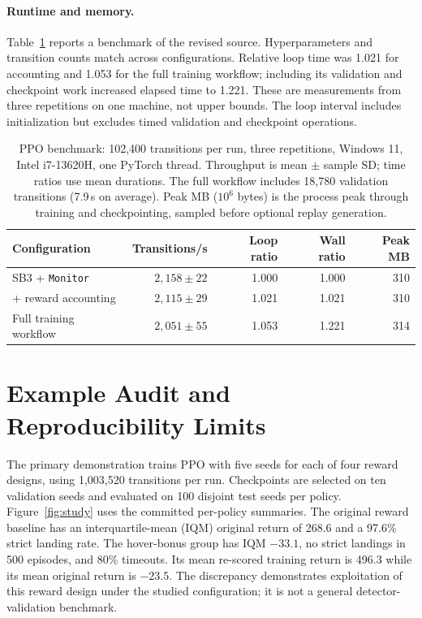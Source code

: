 \documentclass[twoside,11pt]{article}
\begin{document}
\paragraph{Runtime and memory.} Table~\ref{tab:overhead} reports a benchmark of the revised source.
Hyperparameters and transition counts match across configurations. Relative loop time was
1.021 for accounting and 1.053 for the full training workflow; including its validation and checkpoint work
increased elapsed time to 1.221. These are measurements from three repetitions on one machine, not upper bounds.
The loop interval includes initialization but excludes timed validation and checkpoint operations.
\begin{table}[t]
\centering\small
\begin{tabular}{@{}lrrrr@{}}
\toprule
Configuration & Transitions/s & Loop ratio & Wall ratio & Peak MB \\
\midrule
SB3 + \texttt{Monitor} & $2{,}158\pm22$ & 1.000 & 1.000 & 310 \\
+ reward accounting & $2{,}115\pm29$ & 1.021 & 1.021 & 310 \\
Full training workflow & $2{,}051\pm55$ & 1.053 & 1.221 & 314 \\
\bottomrule
\end{tabular}
\caption{PPO benchmark: 102,400 transitions per run, three repetitions, Windows 11, Intel i7-13620H, one PyTorch
thread. Throughput is mean $\pm$ sample SD; time ratios use mean durations. The full workflow includes 18,780
validation transitions (7.9\,s on average). Peak MB ($10^6$ bytes) is the process peak through training and
checkpointing, sampled before optional replay generation.}
\label{tab:overhead}
\end{table}

\section{Example Audit and Reproducibility Limits}
The primary demonstration trains PPO \citep{schulman2017ppo} with five seeds for each of four reward designs,
using 1,003,520 transitions per run. Checkpoints are selected on ten validation seeds and evaluated on 100
disjoint test seeds per policy. Figure~\ref{fig:study} uses the committed per-policy summaries. The original
reward baseline has an interquartile-mean (IQM) original return of 268.6 and a 97.6\% strict landing rate.
The hover-bonus group has IQM $-33.1$, no strict landings in 500 episodes, and 80\% timeouts. Its mean re-scored
training return is 496.3 while its mean original return is $-23.5$. The discrepancy demonstrates exploitation
of this reward design under the studied configuration; it is not a general detector-validation benchmark.
\end{document}
